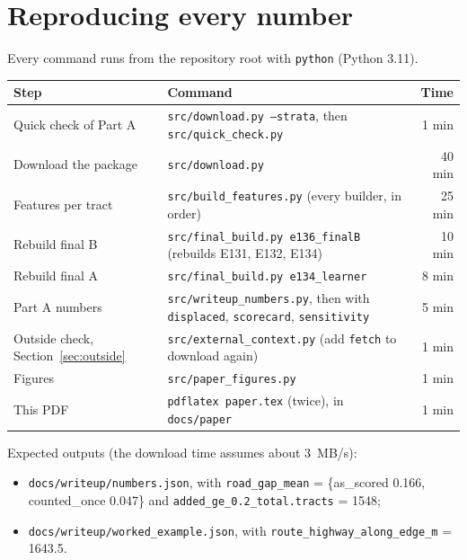 \documentclass[10pt,twocolumn,a4paper]{article}
\newcommand{\code}[1]{\texttt{\small #1}}
\begin{document}
\section{Reproducing every number}
\label{app:repro}
Every command runs from the repository root with \code{python} (Python 3.11).
\begin{table}[H]
\centering\footnotesize
\begin{tabularx}{\columnwidth}{@{}>{\raggedright\arraybackslash}p{}Lr@{}}
\toprule
Step & Command & Time\\
\midrule
Quick check of Part A & \texttt{src/download.py --strata}, then \texttt{src/quick\_check.py} & 1 min\\
Download the package & \texttt{src/download.py} & 40 min\\
Features per tract & \texttt{src/build\_features.py} (every builder, in order) & 25 min\\
Rebuild final B & \texttt{src/final\_build.py e136\_finalB} (rebuilds E131, E132, E134) & 10 min\\
Rebuild final A & \texttt{src/final\_build.py e134\_learner} & 8 min\\
Part A numbers & \texttt{src/writeup\_numbers.py}, then with \texttt{displaced}, \texttt{scorecard}, \texttt{sensitivity} & 5 min\\
Outside check, Section~\ref{sec:outside} & \texttt{src/external\_context.py} (add \texttt{fetch} to download again) & 1 min\\
Figures & \texttt{src/paper\_figures.py} & 1 min\\
This PDF & \texttt{pdflatex paper.tex} (twice), in \texttt{docs/paper} & 1 min\\
\bottomrule
\end{tabularx}
\end{table}
{\raggedright Expected outputs (the download time assumes about 3~MB/s):
\begin{itemize}
\item \code{docs/writeup/numbers.json}, with \code{road\_gap\_mean} = \{as\_scored 0.166, counted\_once 0.047\} and
\code{added\_ge\_0.2\_total.tracts} = 1548;
\item \code{docs/writeup/worked\_example.json}, with \code{route\_highway\_along\_edge\_m} = 1643.5.
\end{itemize}\par}
\end{document}
